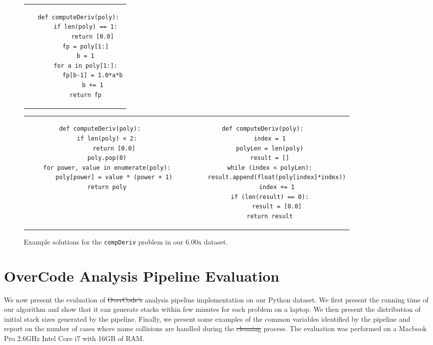 \documentclass[12pt,twoside]{mitthesis}
\newcommand \codevar[1]{\texttt{#1}}
\providecommand{\DIFaddtex}[1]{{\protect\color{blue}\uwave{#1}}} %
\providecommand{\DIFdeltex}[1]{{\protect\color{red}\sout{#1}}}                      %
\providecommand{\DIFaddbegin}{} %
\providecommand{\DIFaddend}{} %
\providecommand{\DIFdelbegin}{} %
\providecommand{\DIFdelend}{} %
\providecommand{\DIFadd}[1]{\texorpdfstring{\DIFaddtex{#1}}{#1}} %
\providecommand{\DIFdel}[1]{\texorpdfstring{\DIFdeltex{#1}}{}} %
\begin{document}
{{{{{{{{{{\begin{figure}
\begin{tabular}{cc}
\begin{minipage}{0.5\linewidth}
\begin{lstlisting}[]
\end{lstlisting}
\end{minipage}
&
\begin{minipage}{0.5\linewidth}
\begin{lstlisting}[]
def computeDeriv(poly):
    if len(poly) == 1:
        return [0.0]
    fp = poly[1:]
    b = 1
    for a in poly[1:]:
        fp[b-1] = 1.0*a*b
        b += 1
    return fp
\end{lstlisting}
\end{minipage}
\\
\end{tabular}
\begin{tabular}{c c}
\begin{minipage}{0.4\linewidth}
\begin{lstlisting}[]
def computeDeriv(poly):
    if len(poly) < 2:
        return [0.0]
    poly.pop(0)
    for power, value in enumerate(poly):
        poly[power] = value * (power + 1)
    return poly
\end{lstlisting}
\end{minipage}
&
\begin{minipage}{0.4\linewidth}
\begin{lstlisting}[]
def computeDeriv(poly):
    index = 1
    polyLen = len(poly)
    result = []
    while (index < polyLen):
        result.append(float(poly[index]*index))
        index += 1
    if (len(result) == 0):
        result = [0.0]
    return result
\end{lstlisting}
\end{minipage}

\end{tabular}
\caption{Example solutions for the \codevar{compDeriv} problem in our 6.00x dataset.}
\label{cdexamples}
\end{figure}


\section{OverCode Analysis Pipeline Evaluation}
We now present the evaluation of \DIFdelbegin \DIFdel{OverCode's }\DIFdelend \DIFaddbegin \DIFadd{the OverCode }\DIFaddend analysis pipeline implementation on our Python dataset. We first present the running time of our algorithm and show that it can generate stacks within \DIFaddbegin \DIFadd{a }\DIFaddend few minutes for each problem on a laptop. We then present the distribution of initial stack sizes generated by the pipeline. Finally, we present some examples of the common variables identified by the pipeline and report on the number of cases where name collisions are handled during the \DIFdelbegin \DIFdel{cleaning }\DIFdelend \DIFaddbegin \DIFadd{normalizing }\DIFaddend process. The evaluation was performed on a Macbook Pro 2.6GHz Intel Core i7 with 16GB of RAM. %

}}}}}}}}}}
\end{document}
